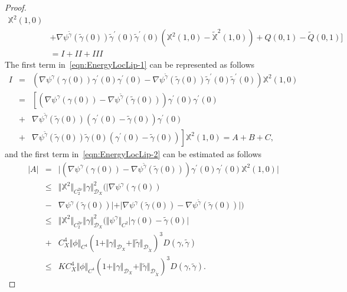 \documentclass[11pt,a4paper,reqno]{amsart}%
\theoremstyle{plain}
\theoremstyle{remark}
\theoremstyle{plain}
\numberwithin{equation}{section}
\begin{document}
\begin{proof}
\begin{align}
\mathbb{X}^2(1,0)\nonumber\\
&+\nabla\psi^{\tilde{\gamma}}(\tilde{\gamma}(0))\tilde{\gamma}^\prime(0)\tilde{\gamma}^\prime(0)(\mathbb{X}^2(1,0)-\mathbb{\tilde{X}}^2(1,0))
+Q(0,1)-\tilde{Q}(0,1)\Big]\!
\nonumber\\
 &=\!I\! +\! II\! +\! III
\end{align}
The first term in~\eqref{eqn:EnergyLocLip-1} can be represented as
follows
\begin{eqnarray}
I &=&
(\nabla\psi^{\gamma}(\gamma(0))\gamma^\prime(0)\gamma^\prime(0)-\nabla\psi^{\tilde{\gamma}}(\tilde{\gamma}(0))\tilde{\gamma}^\prime(0)\tilde{\gamma}^\prime(0))
\mathbb{X}^2(1,0)\nonumber\\
 &=& \left[(\nabla\psi^{\gamma}(\gamma(0))-\nabla\psi^{\tilde{\gamma}}(\tilde{\gamma}(0)))\gamma^\prime(0)\gamma^\prime(0)\right.\nonumber\\
 &+& \nabla\psi^{\tilde{\gamma}}(\tilde{\gamma}(0))(\gamma^\prime(0)-\tilde{\gamma}(0))\gamma^\prime(0)\nonumber\\
 &+& \left.\nabla\psi^{\tilde{\gamma}}(\tilde{\gamma}(0))\tilde{\gamma}(0)(\gamma^\prime(0)-\tilde{\gamma}(0))\right]\mathbb{X}^2(1,0)=A+B+C ,\label{eqn:EnergyLocLip-2}
\end{eqnarray}
and the first term in~\eqref{eqn:EnergyLocLip-2} can be estimated as
follows
\begin{eqnarray}\label{eqn:EnergyLocLip-3}
\vert A\vert &=&\vert (\nabla\psi^{\gamma}(\gamma(0))-\nabla\psi^{\tilde{\gamma}}(\tilde{\gamma}(0)))\gamma^\prime(0)\gamma^\prime(0)\mathbb{X}^2(1,0)\vert \\
&\leq&
\Vert \mathbb{X}^2\Vert_{C_2^{2\nu}}\Vert \gamma\Vert_{\mathcal{D}_X}^2(\vert \nabla\psi^{\gamma}
(\gamma(0))\nonumber\\
&-&\nabla\psi^{\gamma}(\tilde{\gamma}(0))\vert +\vert \nabla\psi^{\gamma}(\tilde{\gamma}(0))-\nabla\psi^{\tilde{\gamma}}(\tilde{\gamma}(0))\vert )\nonumber\\
&\leq &\Vert \mathbb{X}^2\Vert_{C_2^{2\nu}}\Vert \gamma\Vert_{\mathcal{D}_X}^2(\Vert \psi^{\gamma}\Vert_{C^2}\vert \gamma(0)-\tilde{\gamma}(0)\vert
\nonumber\\
&+&C_X^4\Vert \phi\Vert_{C^4}(1+\Vert \gamma\Vert_{\mathcal{D}_X}+\Vert \tilde{\gamma}\Vert_{\mathcal{D}_{\tilde{X}}})^3 D( \gamma,\tilde{\gamma})
\nonumber\\
&\leq&
KC_X^4\Vert \phi\Vert_{C^4}(1+\Vert \gamma\Vert_{\mathcal{D}_X}+\Vert \tilde{\gamma}\Vert_{\mathcal{D}_{\tilde{X}}})^3 D( \gamma,\tilde{\gamma}).
\nonumber
\end{eqnarray}

\end{proof}
\end{document}
